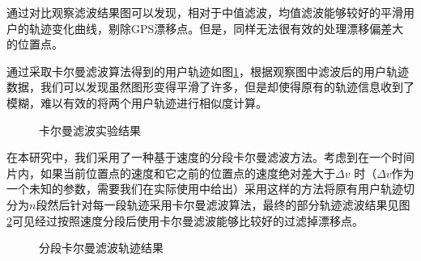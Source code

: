 \par 通过对比观察滤波结果图可以发现，相对于中值滤波，均值滤波能够较好的平滑用户的轨迹变化曲线，剔除GPS漂移点。但是，同样无法很有效的处理漂移偏差大的位置点。
\par 通过采取卡尔曼滤波算法得到的用户轨迹如图\ref{fig:3_4_1}，根据观察图中滤波后的用户轨迹数据，我们可以发现虽然图形变得平滑了许多，但是却使得原有的轨迹信息收到了模糊，难以有效的将两个用户轨迹进行相似度计算。
\begin{figure}[htb]
  \centering%
  \hspace{4em}%
  \caption{卡尔曼滤波实验结果}
  \label{fig:3_4_1}
\end{figure}
\par 在本研究中，我们采用了一种基于速度的分段卡尔曼滤波方法。考虑到在一个时间片内，如果当前位置点的速度和它之前的位置点的速度绝对差大于$\Delta v$ 时（$\Delta v$作为一个未知的参数，需要我们在实际使用中给出）采用这样的方法将原有用户轨迹切分为$n$段然后针对每一段轨迹采用卡尔曼滤波算法，最终的部分轨迹滤波结果见图\ref{fig:3_5_1}可见经过按照速度分段后使用卡尔曼滤波能够比较好的过滤掉漂移点。
\begin{figure}[htb]
  \centering%
  \hspace{4em}%
  \caption{分段卡尔曼滤波轨迹结果}
  \label{fig:3_5_1}
\end{figure}

